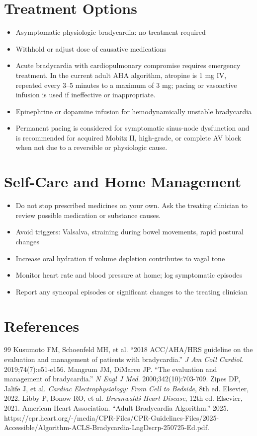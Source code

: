 \section*{Treatment Options}
\begin{itemize}
 \item Asymptomatic physiologic bradycardia: no treatment required
 \item Withhold or adjust dose of causative medications
 \item Acute bradycardia with cardiopulmonary compromise requires emergency treatment. In the current adult AHA algorithm, atropine is 1 mg IV, repeated every 3--5 minutes to a maximum of 3 mg; pacing or vasoactive infusion is used if ineffective or inappropriate.
 \item Epinephrine or dopamine infusion for hemodynamically unstable bradycardia
 \item Permanent pacing is considered for symptomatic sinus-node dysfunction and is recommended for acquired Mobitz II, high-grade, or complete AV block when not due to a reversible or physiologic cause.
\end{itemize}

\section*{Self-Care and Home Management}
\begin{itemize}
 \item Do not stop prescribed medicines on your own. Ask the treating clinician to review possible medication or substance causes.
 \item Avoid triggers: Valsalva, straining during bowel movements, rapid postural changes
 \item Increase oral hydration if volume depletion contributes to vagal tone
 \item Monitor heart rate and blood pressure at home; log symptomatic episodes
 \item Report any syncopal episodes or significant changes to the treating clinician
\end{itemize}

\section*{References}
\begin{thebibliography}{99}
 Kusumoto FM, Schoenfeld MH, et al. ``2018 ACC/AHA/HRS guideline on the evaluation and management of patients with bradycardia.'' \textit{J Am Coll Cardiol}. 2019;74(7):e51-e156.
 Mangrum JM, DiMarco JP. ``The evaluation and management of bradycardia.'' \textit{N Engl J Med}. 2000;342(10):703-709.
 Zipes DP, Jalife J, et al. \textit{Cardiac Electrophysiology: From Cell to Bedside}, 8th ed. Elsevier, 2022.
 Libby P, Bonow RO, et al. \textit{Braunwald\'s Heart Disease}, 12th ed. Elsevier, 2021.
 American Heart Association. ``Adult Bradycardia Algorithm.'' 2025. https://cpr.heart.org/-/media/CPR-Files/CPR-Guidelines-Files/2025-Accessible/Algorithm-ACLS-Bradycardia-LngDscrp-250725-Ed.pdf.
\end{thebibliography}
